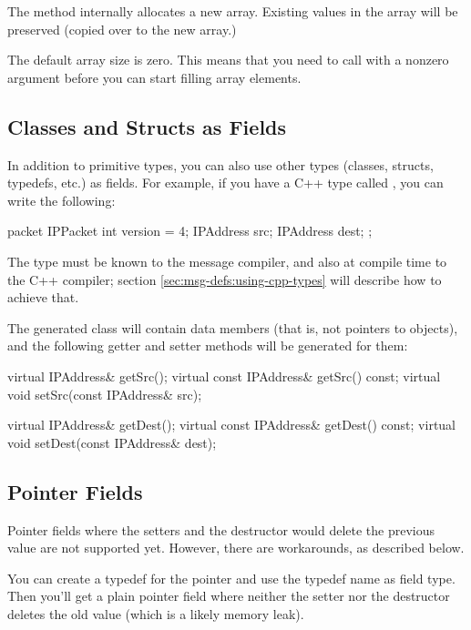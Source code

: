 The  method internally allocates a new array. Existing
values in the array will be preserved (copied over to the new array.)

The default array size is zero. This means that you need to call
 with a nonzero argument before you can
start filling array elements.


\subsection{Classes and Structs as Fields}
\label{sec:msg-defs:other-types-as-fields}

In addition to primitive types, you can also use other types (classes,
structs, typedefs, etc.) as fields. For example, if you have a C++ type
called , you can write the following:

\begin{msg}
packet IPPacket
{
    int version = 4;
    IPAddress src;
    IPAddress dest;
};
\end{msg}

The  type must be known to the message compiler, and
also at compile time to the C++ compiler; section
\ref{sec:msg-defs:using-cpp-types} will describe how to achieve that.

The generated class will contain  data members
(that is, not pointers to  objects), and
the following getter and setter methods will be generated for them:

\begin{cpp}
virtual IPAddress& getSrc();
virtual const IPAddress& getSrc() const;
virtual void setSrc(const IPAddress& src);

virtual IPAddress& getDest();
virtual const IPAddress& getDest() const;
virtual void setDest(const IPAddress& dest);
\end{cpp}


\subsection{Pointer Fields}
\label{sec:msg-defs:pointers-fields}

Pointer fields where the setters and the destructor would delete the
previous value are not supported yet. However, there are workarounds, as
described below.

You can create a typedef for the pointer and use the typedef name as field
type. Then you'll get a plain pointer field where neither the setter nor
the destructor deletes the old value (which is a likely memory leak).

